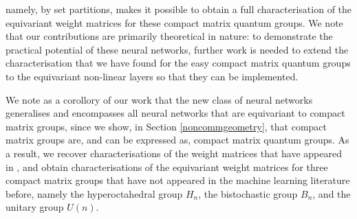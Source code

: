 \documentclass{article}
\theoremstyle{plain}
\theoremstyle{definition}
\theoremstyle{remark}
\begin{document}
namely, by set partitions,
makes it possible to obtain a full characterisation of the equivariant weight matrices 
for these compact matrix quantum groups.
We note that our contributions are primarily theoretical in nature: to demonstrate the 
practical potential of these neural networks, further work is needed to extend
the characterisation 
that we have found
for the easy compact matrix quantum groups
to the equivariant non-linear layers so that they can be implemented.

We note as a corollory of our work that
the new class of neural networks generalises and encompasses all
neural networks that are equivariant to compact matrix groups, since
we show, in Section \ref{noncommgeometry},
that compact matrix groups are, and can be expressed as, compact matrix quantum groups.
As a result, we recover characterisations of the weight matrices
that have appeared in \citet{ravanbakhsh17a, maron2018, pearcecrumpB, pearcecrump, godfrey},
and obtain characterisations of the equivariant weight matrices for three
compact matrix groups that have not appeared in the machine learning literature before,
namely the hyperoctahedral group $H_n$, the bistochastic group $B_n$, 
and the unitary group $U(n)$.
\end{document}
